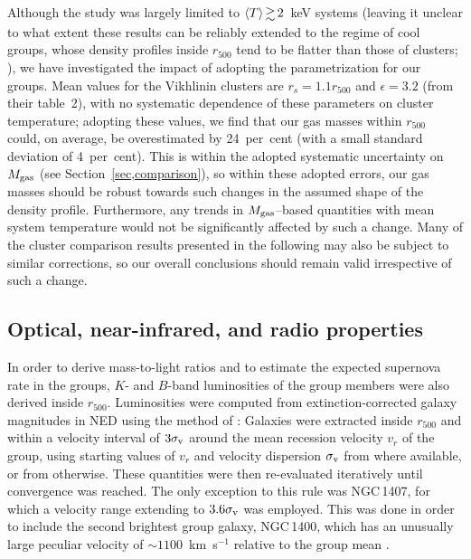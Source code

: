 \documentclass[useAMS,usenatbib]{mn2e}
\begin{document}
Although the \citet{vikh06} study was largely limited to $\langle T
\rangle \ga 2$~keV systems (leaving it unclear to what extent these
results can be reliably extended to the regime of cool groups, whose
density profiles inside $r_{500}$ tend to be flatter than those of
clusters; \citealt{sand03b}), we have investigated the impact of
adopting the \citet{vikh06} parametrization for our groups. Mean
values for the Vikhlinin clusters are $r_s =1.1 r_{500}$ and
$\epsilon=3.2$ (from their table~2), with no systematic dependence of
these parameters on cluster temperature; adopting these values, we
find that our gas masses within $r_{500}$ could, on average, be
overestimated by 24~per~cent (with a small standard deviation of
4~per~cent). This is within the adopted systematic uncertainty on
$M_{\rm gas}$ (see Section~\ref{sec,comparison}), so within these
adopted errors, our gas masses should be robust towards such changes
in the assumed shape of the density profile. Furthermore, any trends
in $M_{\rm gas}$--based quantities with mean system temperature would
not be significantly affected by such a change. Many of the cluster
comparison results presented in the following may also be subject to
similar corrections, so our overall conclusions should remain valid
irrespective of such a change.



\subsection{Optical, near-infrared, and radio properties}\label{sec,optical}

In order to derive mass-to-light ratios and to estimate the expected
supernova rate in the groups, $K$- and $B$-band luminosities of the
group members were also derived inside $r_{500}$.  Luminosities were
computed from extinction-corrected galaxy magnitudes in NED using the
method of \citet{osmo04}: Galaxies were extracted inside $r_{500}$ and
within a velocity interval of $3\sigma_{\rm v}$ around the mean
recession velocity $v_r$ of the group, using starting values of $v_r$
and velocity dispersion $\sigma_{\rm v}$ from \citet{osmo04} where
available, or from \citet{mulc03} otherwise. These quantities were
then re-evaluated iteratively until convergence was reached.  The only
exception to this rule was NGC\,1407, for which a velocity range
extending to $3.6\sigma_{\rm v}$ was employed. This was done in order
to include the second brightest group galaxy, NGC\,1400, which has an
unusually large peculiar velocity of $\sim 1100$~km~s$^{-1}$ relative
to the group mean \citep*{tren06}.
\end{document}
